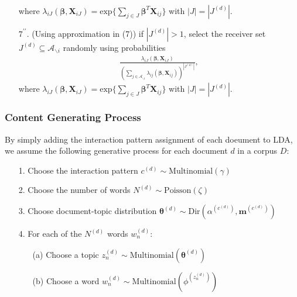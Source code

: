 \documentclass[a4paper]{article}
\begin{document}
\begin{itemize}
\begin{align*}
\end{align*}
where $\lambda_{iJ}(\boldsymbol{\beta}, \boldsymbol{X}_{iJ})= \mbox{exp}\Big\{\sum\limits_{j \in J}\boldsymbol{\beta}^{T}\boldsymbol{X}_{ij}\Big\}$ with $|J|=|J^{(d)}|$.
\item[$7^{\prime\prime}$.] (Using approximation in (7)) if $|J^{(d)}|>1$, select the receiver set  $J^{(d)} \subseteq \mathcal{A}_{\backslash i}$ randomly using probabilities
\begin{align*}\frac{\lambda_{iJ}(\boldsymbol{\beta}, \boldsymbol{X}_{iJ})}{({\sum\limits_{j \in \mathcal{A}_{\backslash i} } \lambda_{ij}(\boldsymbol{\beta}, \boldsymbol{X}_{ij})})^{|J^{(d)}|}},
\end{align*}
where $\lambda_{iJ}(\boldsymbol{\beta}, \boldsymbol{X}_{iJ})= \mbox{exp}\Big\{\sum\limits_{j \in J}\boldsymbol{\beta}^{T}\boldsymbol{X}_{ij}\Big\}$ with $|J|=|J^{(d)}|$.
\end{itemize}
\subsubsection{Content Generating Process}
By simply adding the interaction pattern assignment of each doeument to LDA, we assume the following generative process for each document $d$ in a corpus $D$:
\begin{itemize}
	\item[1.] Choose the interaction pattern $c^{(d)} \sim \mbox{Multinomial}(\gamma)$
	\item[2.] Choose the number of words $N^{(d)} \sim \mbox{Poisson}(\zeta)$
	\item[3.] Choose document-topic distribution $\boldsymbol{\theta}^{(d)}\sim \mbox{Dir}(\alpha^{(c^{(d)})}, \boldsymbol{m}^{(c^{(d)})})$
	\item[4.] For each of the $N^{(d)}$ words $w_n^{(d)}$:
 		\begin{itemize}
 			\item[(a)] Choose a topic $z_n^{(d)} \sim \mbox{Multinomial}(\boldsymbol{\theta}^{(d)})$
 			\item[(b)] Choose a word $w_n^{(d)} \sim\mbox{Multinomial} (\phi^{(z_n^{(d)})})$
 		\end{itemize}
\end{itemize}
\end{document}
